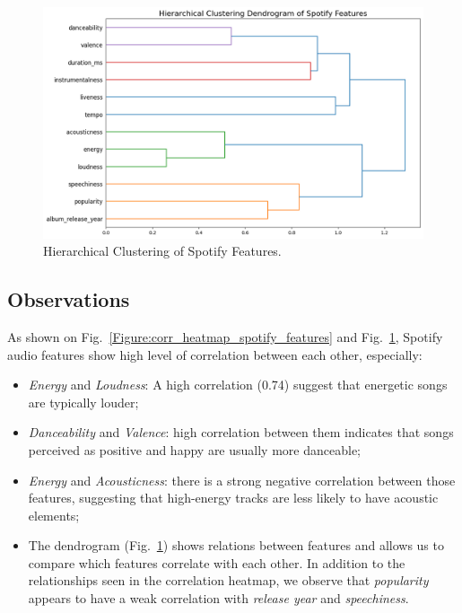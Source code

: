 \begin{center}
\begin{figure}[H]
  \centering
  \includegraphics[width=6in]{img/dendrogram_spotify_features.png}
  \caption{Hierarchical Clustering of Spotify Features.}
  \label{Figure:dendrogram_spotify_features}
\end{figure}
\end{center}

\subsection*{Observations}
As shown on Fig.~\ref{Figure:corr_heatmap_spotify_features} and
Fig.~\ref{Figure:dendrogram_spotify_features}, Spotify audio features show high
level of correlation between each other, especially:
\begin{itemize}
  \item \textit{Energy} and \textit{Loudness}: A high correlation (0.74) suggest
    that energetic songs are typically louder;
  \item \textit{Danceability} and \textit{Valence}: high correlation between
    them indicates that songs perceived as positive and happy are usually more
    danceable;
  \item \textit{Energy} and \textit{Acousticness}: there is a strong negative
    correlation between those features, suggesting that high-energy tracks are
    less likely to have acoustic elements;
  \item The dendrogram (Fig.~\ref{Figure:dendrogram_spotify_features}) shows relations
    between features and allows us to compare which features correlate with
    each other. In addition to the relationships seen in the correlation
    heatmap, we observe that \textit{popularity} appears to have a weak
    correlation with \textit{release year} and \textit{speechiness}.

\end{itemize}


